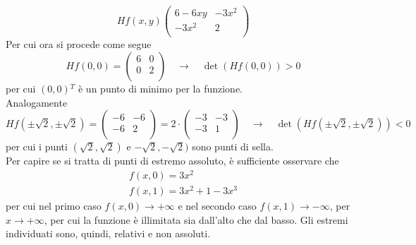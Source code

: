 \documentclass[a4paper]{extarticle}
\begin{document}
\[
    Hf(x,y)
    \left(
    \begin{array}{cc}
        6-6xy & -3x^2\\
        -3x^2 & 2\\
    \end{array}
    \right)
\]
Per cui ora si procede come segue
\[
    Hf(0,0) = 
    \left(
    \begin{array}{cc}
        6 & 0\\
        0 & 2\\
    \end{array}
    \right) \hspace{1em} \rightarrow \hspace{1em} \det(Hf(0,0)) > 0
\]
per cui $(0,0){^T}$ è un punto di minimo per la funzione.\\
Analogamente
\[
    Hf(\pm \sqrt{2},\pm \sqrt{2}) = 
    \left(
    \begin{array}{cc}
        -6 & -6\\
        -6 & 2\\
    \end{array}
    \right) = 2 \cdot \left(
        \begin{array}{cc}
            -3 & -3\\
            -3 & 1\\
        \end{array}
        \right)
        \hspace{1em} \rightarrow \hspace{1em} \det(Hf(\pm \sqrt{2},\pm \sqrt{2})) < 0
\]
per cui i punti $(\sqrt{2},\sqrt{2})$ e $-\sqrt{2},- \sqrt{2})$ sono punti di sella.\\
Per capire se si tratta di punti di estremo assoluto, è sufficiente osservare che
\begin{align*}
    f(x,0) = 3x^2\\
    f(x,1) = 3x^2+1-3x^3
\end{align*}
per cui nel primo caso $f(x,0) \to +\infty$ e nel secondo caso $f(x,1) \to -\infty$, per $x \to +\infty$, per cui la funzione è illimitata sia dall'alto che dal basso. Gli estremi individuati sono, quindi, relativi e non assoluti.
\end{document}
